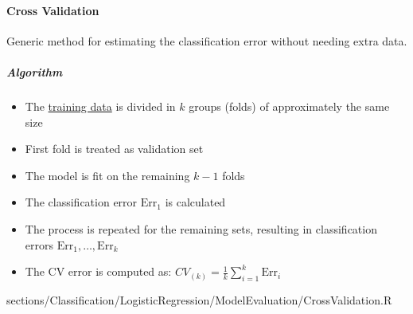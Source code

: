 	\paragraph{Cross Validation}
		Generic method for estimating the classification error without needing extra data.
		\subparagraph{Algorithm}
			\RTheory
			{
				\begin{itemize}
				    \item The \underline{training data} is divided in $k$ groups (folds) of approximately the same size
				    \item First fold is treated as validation set
				    \item The model is fit on the remaining $k-1$ folds
				    \item The classification error $\mathrm{Err}_1$ is calculated
				    \item The process is repeated for the remaining sets, resulting in classification errors $\mathrm{Err}_1, \dots, \mathrm{Err}_k$
				    \item The CV error is computed as: $CV_{(k)} = \frac{1}{k} \sum\limits_{i=1}^k\mathrm{Err}_i$
				\end{itemize}
			}
			{
				sections/Classification/LogisticRegression/ModelEvaluation/CrossValidation.R
			}

		